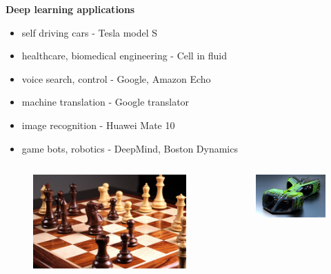 \documentclass[xcolor=dvipsnames]{beamer}
\begin{document}
\begin{frame}{\bf Deep learning applications}

\begin{itemize}
  \item self driving cars - Tesla model S
  \item healthcare, biomedical engineering - Cell in fluid
  \item voice search, control - Google, Amazon Echo
  \item machine translation - Google translator
  \item image recognition - Huawei Mate 10
  \item game bots, robotics - DeepMind, Boston Dynamics
\end{itemize}

\begin{columns}

    \begin{column}{0.33\textwidth}

      \begin{figure}
        \includegraphics[scale=0.03]{../../pictures/chess.jpg}
      \end{figure}

    \end{column}

    \begin{column}{0.33\textwidth}  %

      \begin{figure}
      \includegraphics[scale=0.15]{../../pictures/nvidia_car.jpg}
      \end{figure}


\end{column}
\end{columns}
\end{frame}
\end{document}
